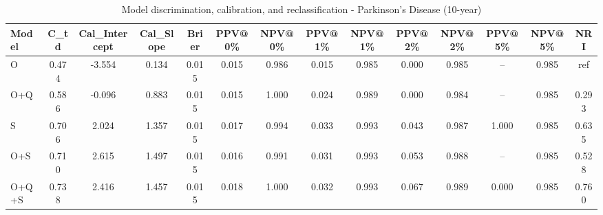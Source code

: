 \begin{table}[htbp]
\centering
\small
\caption{Model discrimination, calibration, and reclassification - Parkinson's Disease (10-year)}
\label{tab:perf_pd_10y}
\begin{tabular}{lccccccccccccc}
\toprule
Model & C\_td & Cal\_Intercept & Cal\_Slope & Brier & PPV@0\% & NPV@0\% & PPV@1\% & NPV@1\% & PPV@2\% & NPV@2\% & PPV@5\% & NPV@5\% & NRI \\
\midrule
O & 0.474 & -3.554 & 0.134 & 0.015 & 0.015 & 0.986 & 0.015 & 0.985 & 0.000 & 0.985 & -- & 0.985 & ref \\
O+Q & 0.586 & -0.096 & 0.883 & 0.015 & 0.015 & 1.000 & 0.024 & 0.989 & 0.000 & 0.984 & -- & 0.985 & 0.293 \\
S & 0.706 & 2.024 & 1.357 & 0.015 & 0.017 & 0.994 & 0.033 & 0.993 & 0.043 & 0.987 & 1.000 & 0.985 & 0.635 \\
O+S & 0.710 & 2.615 & 1.497 & 0.015 & 0.016 & 0.991 & 0.031 & 0.993 & 0.053 & 0.988 & -- & 0.985 & 0.528 \\
O+Q+S & 0.738 & 2.416 & 1.457 & 0.015 & 0.018 & 1.000 & 0.032 & 0.993 & 0.067 & 0.989 & 0.000 & 0.985 & 0.760 \\
\bottomrule
\end{tabular}
\end{table}